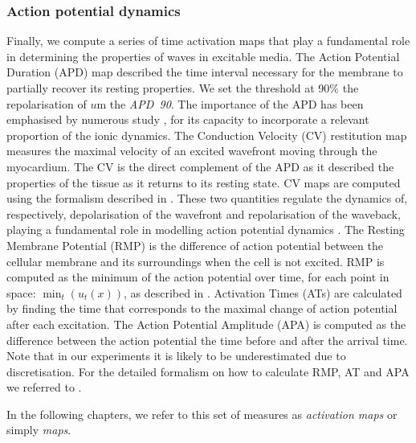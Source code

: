 \documentclass[utf8]{frontiersSCNS} %
\begin{document}
\subsubsection{Action potential dynamics}
\label{sec:methods:evaluation:maps}
Finally, we compute a series of time activation maps that play a fundamental role in determining the properties of waves in excitable media.
The Action Potential Duration (APD) map described the time interval necessary for the membrane to partially recover its resting properties. We set the threshold at 90\% the repolarisation of $u$m the \textit{APD~90}. The importance of the APD has been emphasised by numerous study \cite[]{boyett1978study, elharrar1983cycle}, for its capacity to incorporate a relevant proportion of the ionic dynamics.
The Conduction Velocity (CV) restitution map measures the maximal velocity of an excited wavefront moving through the myocardium. The CV is the direct complement of the APD as it described the properties of the tissue as it returns to its resting state. CV maps are computed using the formalism described in \cite{cantwell2015techniques}.
These two quantities regulate the dynamics of, respectively, depolarisation of the wavefront and repolarisation of the waveback, playing a fundamental role in modelling action potential dynamics \cite[]{Fenton1998}.
The Resting Membrane Potential (RMP) is the difference of action potential between the cellular membrane and its surroundings when the cell is not excited.
RMP is computed as the minimum of the action potential over time, for each point in space: $\min_{t} (u_t(x))$, as described in \cite{varela2016atrial}.
Activation Times (ATs) are calculated by finding the time that corresponds to the maximal change of action potential after each excitation.
The Action Potential Amplitude (APA) is computed as the difference between the action potential the time before and after the arrival time. Note that in our experiments it is likely to be underestimated due to discretisation.
For the detailed formalism on how to calculate RMP, AT and APA we referred to \cite{varela2016atrial}.

In the following chapters, we refer to this set of measures as \textit{activation maps} or simply \textit{maps}.
\end{document}
